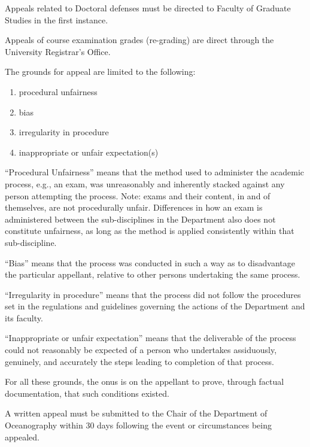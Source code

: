  Appeals related to Doctoral defenses must be directed to Faculty of
Graduate Studies in the first instance. 

 Appeals of course examination grades (re-grading) are direct through
the University Registrar's Office.
 
 The grounds for appeal are limited to the following:
\begin{enumerate} \item procedural unfairness \item bias \item irregularity in
        procedure \item inappropriate or unfair expectation(s) \end{enumerate}

``Procedural Unfairness'' means that the method used to administer the academic
process, e.g., an exam, was unreasonably and inherently stacked against any
person attempting the process.  Note: exams and their content, in and of
themselves, are not procedurally unfair.  Differences in how an exam is
administered between the sub-disciplines in the Department also does not
constitute unfairness, as long as the method is applied consistently within
that sub-discipline.  

``Bias'' means that the process was conducted in such a way as to disadvantage the
particular appellant, relative to other persons undertaking the same process.    

``Irregularity in procedure'' means that the process did not follow the
procedures set in the regulations and guidelines governing the actions of the
Department and its faculty.  

``Inappropriate or unfair expectation'' means that the deliverable of the
process could not reasonably be expected of a person who undertakes
assiduously, genuinely, and accurately the steps leading to completion of that
process.   

For all these grounds, the onus is on the appellant to prove, through factual
documentation, that such conditions existed. 

 A written appeal must be submitted to the Chair of the Department of
Oceanography within 30 days following the event or circumstances being
appealed. 

